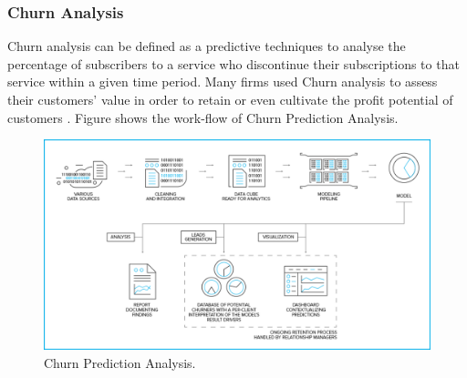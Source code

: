 \documentclass[journal]{IEEEtran}
\begin{document}
\subsubsection{Churn Analysis}
Churn analysis can be defined as a predictive techniques to analyse the percentage of subscribers to a service who discontinue their subscriptions to that service within a given time period\cite{Tsai2010-xf}. Many firms used Churn analysis to assess their customers’ value in order to retain or even cultivate the profit potential of customers \cite{Kim2004-fx}. Figure shows the work-flow of Churn Prediction Analysis.

\begin{figure}[!ht]
	\centering
	\includegraphics[scale=0.2]{churn}
	\caption{Churn Prediction Analysis.}
\end{figure}



	
	
	
	
	
	
\end{document}
